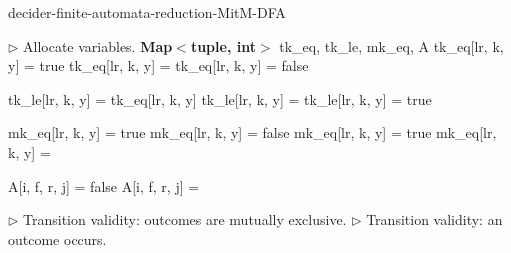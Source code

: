 \begin{algorithm}
  \caption{{\sc decider-finite-automata-reduction-MitM-DFA}}\label{alg:finite-automata-reduction-mitm_dfa}

  \begin{algorithmic}[1]
    \State \(\triangleright\) Allocate variables.
    \State\textbf{Map$\boldsymbol<$tuple, int$\boldsymbol>$} tk\_eq, tk\_le, mk\_eq, A
    tk\_eq[lr, k, y] = true
    tk\_eq[lr, k, y] = 
    \Else\;
    tk\_eq[lr, k, y] = false
    \EndIf

    tk\_le[lr, k, y] = tk\_eq[lr, k, y]
    tk\_le[lr, k, y] = 
    \Else\;
    tk\_le[lr, k, y] = true
    \EndIf

    mk\_eq[lr, k, y] = true
    mk\_eq[lr, k, y] = false
    mk\_eq[lr, k, y] = true
    \Else\;
    mk\_eq[lr, k, y] = 
    \EndIf
    \EndFor

    A[i, f, r, j] = false
    \Else\;
    A[i, f, r, j] = 
    \EndIf
    \EndFor

    \State \(\triangleright\) Transition validity: outcomes are mutually exclusive.
    \State {}
    \State {}
    \State {}
    \EndFor
    \State \(\triangleright\) Transition validity: an outcome occurs.
    \EndFor


\end{algorithmic}
\end{algorithm}
